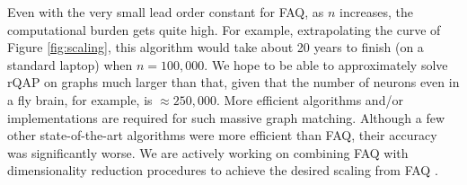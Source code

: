 \documentclass[10pt]{article}
\begin{document}
Even with the very small lead order constant for FAQ, as $n$ increases, the computational burden gets quite high.  For example, extrapolating the curve of Figure \ref{fig:scaling}, this algorithm would take about 20 years to finish (on a standard laptop) when $n=100,000$.  We hope to be able to approximately solve rQAP on graphs much larger than that, given that the number of neurons even in a fly brain, for example, is $\approx 250,000$.  More efficient algorithms and/or implementations are required for such massive graph matching. Although a few other state-of-the-art algorithms were more efficient than FAQ, their accuracy was significantly worse.  We are actively working on combining FAQ with dimensionality reduction procedures to achieve the desired scaling from FAQ \cite{Lyzinski2013}.

\end{document}
